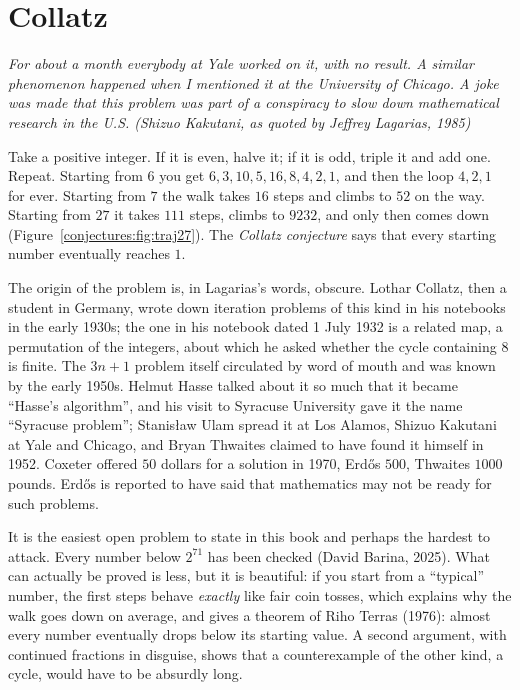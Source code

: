 \chapter{Collatz}\label{conjectures:ch:collatz}

\begin{center}\itshape
For about a month everybody at Yale worked on it, with no result. A similar phenomenon happened when I mentioned it at the University of Chicago. A
joke was made that this problem was part of a conspiracy to slow down mathematical research in the U.S.
\upshape(Shizuo Kakutani, as quoted by Jeffrey Lagarias, 1985)
\end{center}

Take a positive integer. If it is even, halve it; if it is odd, triple it and add one. Repeat. Starting from $6$ you get $6,3,10,5,16,8,4,2,1$, and then
the loop $4,2,1$ for ever. Starting from $7$ the walk takes $16$ steps and climbs to $52$ on the way. Starting from $27$ it takes $111$ steps, climbs to
$9232$, and only then comes down (Figure~\ref{conjectures:fig:traj27}). The \emph{Collatz conjecture} says that every starting number eventually reaches $1$.

The origin of the problem is, in Lagarias's words, obscure. Lothar Collatz, then a student in Germany, wrote down iteration problems of this kind in his
notebooks in the early 1930s; the one in his notebook dated 1 July 1932 is a related map, a permutation of the integers, about which he asked whether
the cycle containing $8$ is finite. The $3n+1$ problem itself circulated by word of mouth and was known by the early 1950s. Helmut Hasse talked about it
so much that it became ``Hasse's algorithm'', and his visit to Syracuse University gave it the name ``Syracuse problem''; Stanis\l aw Ulam spread it at
Los Alamos, Shizuo Kakutani at Yale and Chicago, and Bryan Thwaites claimed to have found it himself in 1952. Coxeter offered $50$ dollars for a
solution in 1970, Erd\H{o}s $500$, Thwaites $1000$ pounds. Erd\H{o}s is reported to have said that mathematics may not be ready for such problems.

It is the easiest open problem to state in this book and perhaps the hardest to attack. Every number below $2^{71}$ has been checked (David Barina,
2025). What can actually be proved is less, but it is beautiful: if you start from a ``typical'' number, the first steps behave \emph{exactly} like
fair coin tosses, which explains why the walk goes down on average, and gives a theorem of Riho Terras (1976): almost every number eventually drops
below its starting value. A second argument, with continued fractions in disguise, shows that a counterexample of the other kind, a cycle, would have to
be absurdly long.

